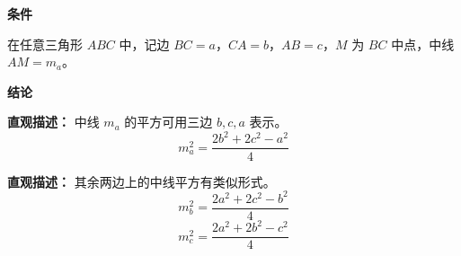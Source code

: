 \begin{statementbox}
	\textbf{\textcolor{CStatement}{条件}}
	\begin{description}[style=nextline, leftmargin=2.8em, labelsep=0.5em, itemsep=0.35em]
		\item[\textbf{\textcolor{CStatement}{条件 1（三角形设定）：}}] 在任意三角形 $ABC$ 中，记边 $BC = a$，$CA = b$，$AB = c$，$M$ 为 $BC$ 中点，中线 $AM = m_a$。
	\end{description}

	\textbf{\textcolor{CStatement}{结论}}
	\begin{description}[style=nextline, leftmargin=2.8em, labelsep=0.5em, itemsep=0.45em]
		\item[\textbf{\textcolor{CStatement}{结论一（中线平方公式）：}}]
			\textbf{\textcolor{CStatement}{直观描述：}}
			中线 $m_a$ 的平方可用三边 $b,c,a$ 表示。
			\[
				m_a^{2} = \frac{2b^{2}+2c^{2}-a^{2}}{4}
			\]

		\item[\textbf{\textcolor{CStatement}{推广结论（对称公式）：}}]
			\textbf{\textcolor{CStatement}{直观描述：}}
			其余两边上的中线平方有类似形式。
			\[
				m_b^{2} = \frac{2a^{2}+2c^{2}-b^{2}}{4}
			\]
			\[
				m_c^{2} = \frac{2a^{2}+2b^{2}-c^{2}}{4}
			\]
	\end{description}
\end{statementbox}
